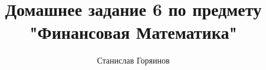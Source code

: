 

\date{}
\title{Домашнее задание 6 по предмету "Финансовая Математика"}
\author{Станислав Горяинов}


\maketitle




